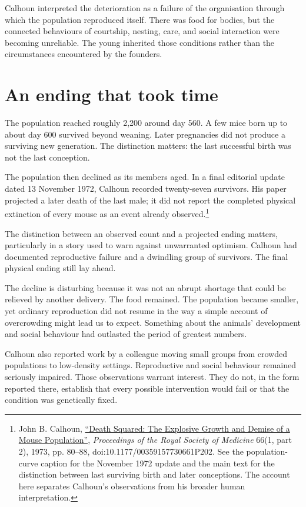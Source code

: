 \documentclass[12pt,a4paper]{book}
\begin{document}
Calhoun interpreted the deterioration as a failure of the organisation through which the population reproduced itself. There was food for bodies, but the connected behaviours of courtship, nesting, care, and social interaction were becoming unreliable. The young inherited those conditions rather than the circumstances encountered by the founders.

\section*{An ending that took time}

The population reached roughly 2,200 around day 560. A few mice born up to about day 600 survived beyond weaning. Later pregnancies did not produce a surviving new generation. The distinction matters: the last successful birth was not the last conception.

The population then declined as its members aged. In a final editorial update dated 13 November 1972, Calhoun recorded twenty-seven survivors. His paper projected a later death of the last male; it did not report the completed physical extinction of every mouse as an event already observed.\footnote{John B. Calhoun, \href{https://journals.sagepub.com/doi/10.1177/00359157730661P202}{``Death Squared: The Explosive Growth and Demise of a Mouse Population''}, \emph{Proceedings of the Royal Society of Medicine} 66(1, part 2), 1973, pp. 80--88, doi:10.1177/00359157730661P202. See the population-curve caption for the November 1972 update and the main text for the distinction between last surviving birth and later conceptions. The account here separates Calhoun's observations from his broader human interpretation.}

The distinction between an observed count and a projected ending matters, particularly in a story used to warn against unwarranted optimism. Calhoun had documented reproductive failure and a dwindling group of survivors. The final physical ending still lay ahead.

The decline is disturbing because it was not an abrupt shortage that could be relieved by another delivery. The food remained. The population became smaller, yet ordinary reproduction did not resume in the way a simple account of overcrowding might lead us to expect. Something about the animals' development and social behaviour had outlasted the period of greatest numbers.

Calhoun also reported work by a colleague moving small groups from crowded populations to low-density settings. Reproductive and social behaviour remained seriously impaired. Those observations warrant interest. They do not, in the form reported there, establish that every possible intervention would fail or that the condition was genetically fixed.
\end{document}
